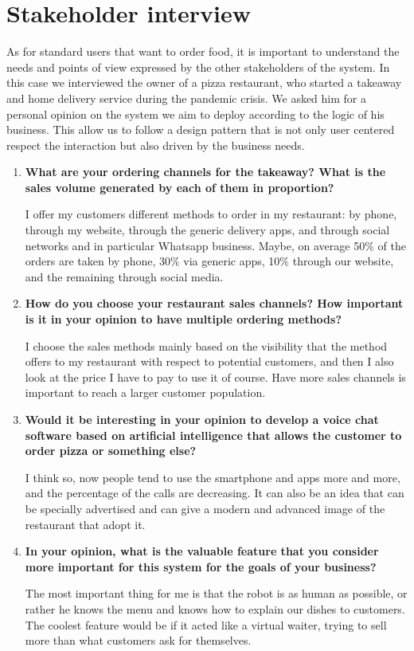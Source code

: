 \section{Stakeholder interview}

As for standard users that want to order food, it is important to understand the needs and points of view expressed by the other stakeholders of the system. In this case we interviewed the owner of a pizza restaurant, who started a takeaway and home delivery service during the pandemic crisis. 
We asked him for a personal opinion on the system we aim to deploy according to the logic of his business. This allow us to follow a design pattern that is not only user centered respect the interaction but also driven by the business needs.


\begin{enumerate}

\item \textbf{What are your ordering channels for the takeaway?
What is the sales volume generated by each of them in proportion?}

I offer my customers different methods to order in my restaurant: by phone, through my website, through the generic delivery apps, and through social networks and in particular Whatsapp business. Maybe, on average 50\% of the orders are taken by phone, 30\% via generic apps, 10\% through our website, and the remaining through social media.

\item \textbf{How do you choose your restaurant sales channels? How important is it in your opinion to have multiple ordering methods?}

I choose the sales methods mainly based on the visibility that the method offers to my restaurant with respect to potential customers, and then I also look at the price I have to pay to use it of course. Have more sales channels is important to reach a larger customer population.

\item \textbf{Would it be interesting in your opinion to develop a voice chat software based on artificial intelligence that allows the customer to order pizza or something else?}

I think so, now people tend to use the smartphone and apps more and more, and the percentage of the calls are decreasing. It can also be an idea that can be specially advertised and can give a modern and advanced image of the restaurant that adopt it.  

\item \textbf{In your opinion, what is the valuable feature that you consider more important for this system for the goals of your business?}

The most important thing for me is that the robot is as human as possible, or rather he knows the menu and knows how to explain our dishes to customers. The coolest feature would be if it acted like a virtual waiter, trying to sell more than what customers ask for themselves. 



\end{enumerate} 
